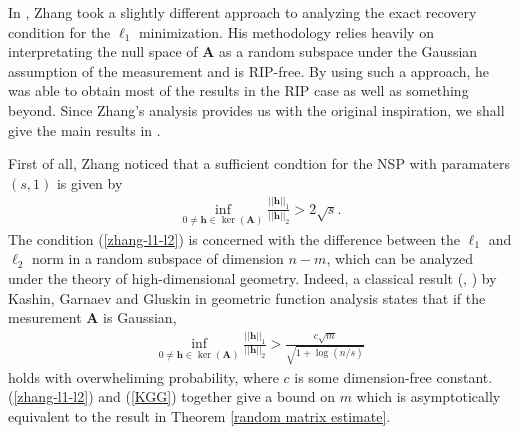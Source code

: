 \documentclass[11pt]{article}
\numberwithin{equation}{section}
\theoremstyle{plain}
\theoremstyle{definition}
\def\A{{\mathbf A}}
\def\h{{\mathbf{h}}}
\begin{document}
In \cite{zhang2013theory}, Zhang took a slightly different approach to analyzing the exact recovery condition for the $\ell_1$ minimization. His methodology relies heavily on interpretating the null space of $\A$ as a random subspace under the Gaussian assumption of the measurement and is RIP-free. By using such a approach, he was able to obtain most of the results in the RIP case as well as something beyond. Since Zhang's analysis provides us with the original inspiration, we shall give the main results in \cite{zhang2013theory}. 

First of all, Zhang noticed that a sufficient condtion for the NSP with paramaters $(s,1)$ is given by
\begin{align}
\inf_{0\neq\h\in\ker(\A)}\frac{||\h||_1}{||\h||_2}>2\sqrt{s}.\label{zhang-l1-l2} 
\end{align} 
The condition (\ref{zhang-l1-l2}) is concerned with the difference between the $\ell_1$ and $\ell_2$ norm in a random subspace of dimension $n-m$, which can be analyzed under the theory of high-dimensional geometry. Indeed, a classical result (\cite{gluskin1984norms},  \cite{kasin1977widths}) by Kashin, Garnaev and Gluskin in geometric function analysis states that if the mesurement $\A$ is Gaussian, 
\begin{align}
\inf_{0\neq\h\in\ker(\A)}\frac{||\h||_1}{||\h||_2}>\frac{c\sqrt{m}}{\sqrt{1+\log (n/s)}}\label{KGG}
\end{align}
holds with overwheliming probability, where $c$ is some dimension-free constant. (\ref{zhang-l1-l2}) and (\ref{KGG}) together give a bound on $m$ which is asymptotically equivalent to the result in Theorem \ref{random matrix estimate}. 
\end{document}

